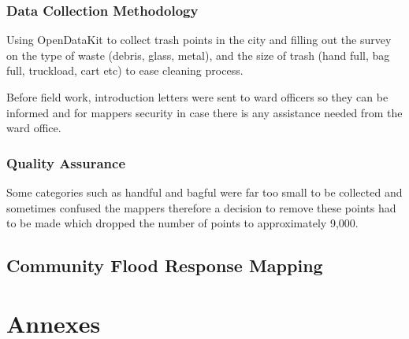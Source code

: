 \documentclass[a4paper,12pt,twoside]{article}
\begin{document}
\subsubsection{Data Collection Methodology}
Using OpenDataKit to collect trash points in the city and filling out the survey on the type of waste (debris, glass, metal), and the size of trash (hand full, bag full, truckload, cart etc) to ease cleaning process.

Before field work, introduction letters were sent to ward officers so they can be informed and for mappers security in case there is any assistance needed from the ward office.

\subsubsection{Quality Assurance}
Some categories such as handful and bagful were far too small to be collected and sometimes confused the mappers therefore a decision to remove these points had to be made which dropped the number of points to approximately 9,000.

\newpage
\subsection{Community Flood Response Mapping}

\newpage
\section{Annexes}
\end{document}
